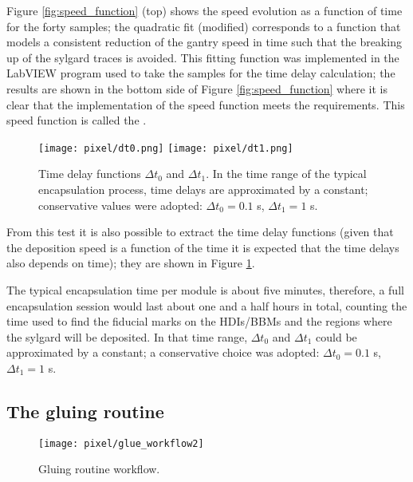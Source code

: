 Figure \ref{fig:speed_function} (top) shows the speed evolution as a function of time for the forty samples; the quadratic fit (modified) corresponds to a function that models a consistent reduction of the gantry speed in time such that the breaking up of the sylgard traces is avoided. This fitting function was implemented in the LabVIEW program used to take the samples for the time delay calculation; the results are shown in the bottom side of Figure \ref{fig:speed_function} where it is clear that the implementation of the speed function meets the requirements. This speed function is called the .

\begin{figure}[h]
  \begin{center}
    \texttt{[image: pixel/dt0.png]} 
    \texttt{[image: pixel/dt1.png]}
    \caption[Time delay functions.]{Time delay functions $\Delta t_0$ and $\Delta t_1$. In the time range of the typical encapsulation process, time delays are approximated by a constant; conservative values were adopted:  $\Delta t_0 =0.1$ s,  $\Delta t_1 = 1$ s.}\label{fig:time_delay_functions}
  \end{center}
\end{figure}

From this test it is also possible to extract the time delay functions (given that the deposition speed is a function of the time it is expected that the time delays also depends on time); they are shown in Figure \ref{fig:time_delay_functions}.

The typical encapsulation time per module is about five minutes, therefore, a full encapsulation session would last about one and a half hours in total, counting the time used to find the fiducial marks on the HDIs/BBMs and the regions where the sylgard will be deposited. In that time range, $\Delta t_0$ and $\Delta t_1$ could be approximated by a constant; a conservative choice was adopted: $\Delta t_0 =0.1$ s,  $\Delta t_1 = 1$ s.            

\subsection{The gluing routine}

\begin{figure}[h]
  \begin{center}
    \texttt{[image: pixel/glue\_workflow2]}
    \caption[Gluing routine workflow.]{Gluing routine workflow.}\label{fig:glue_workflow}
  \end{center}
\end{figure}

